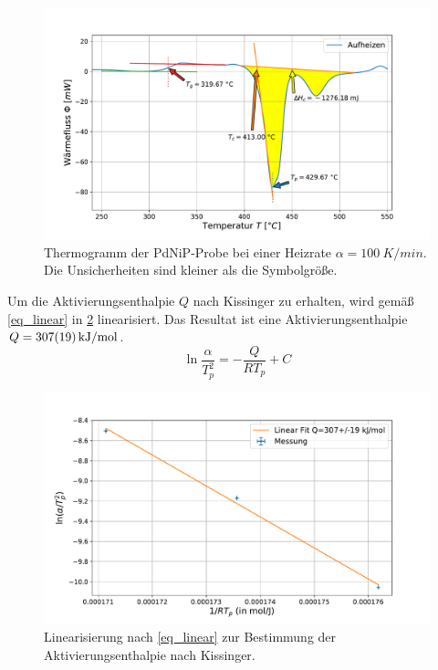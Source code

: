 \documentclass[
	a4paper,
	12pt,
	pagesize,
	ngerman
]{scrartcl}
\begin{document}
	\begin{figure}[H]
			\includegraphics[width=\linewidth]{img/Kalorimetrie_pdnip_100.pdf}
			\caption{
				Thermogramm der PdNiP-Probe bei einer Heizrate $\alpha = \SI{100}{K/min}$.
			Die Unsicherheiten sind kleiner als die Symbolgröße.
			}
			\label{fig_themo_pdnip_100}
		\end{figure}

	Um die Aktivierungsenthalpie $Q$ nach Kissinger zu erhalten, wird gemäß \cref{eq_linear} in \cref{fig_thermo_kissinger} linearisiert.
	Das Resultat ist eine Aktivierungsenthalpie $Q=\SI{307+-19}{kJ/mol}$.
	\begin{equation}
		\label{eq_linear}
			\ln{\frac{\alpha}{T_p^2}} = -\frac{Q}{RT_p} + C
	\end{equation}

\begin{figure}[H]
			\includegraphics[width=\linewidth]{img/Kalorimetrie_kissinger.pdf}
			\caption{
			Linearisierung nach \cref{eq_linear} zur Bestimmung der Aktivierungsenthalpie nach Kissinger.
			}
			\label{fig_thermo_kissinger}
		\end{figure}
\end{document}
